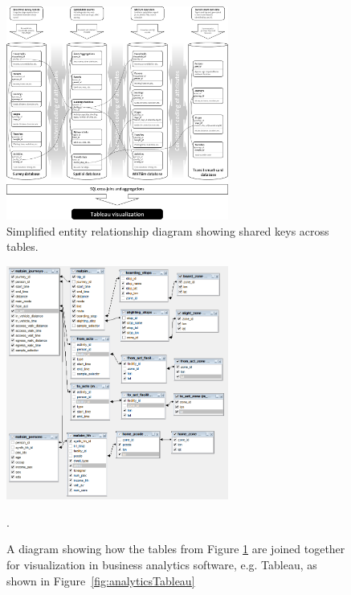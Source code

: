 \begin{figure}
\label{fig:analyticsERD}
\begin{center} \includegraphics[width=0.65\textwidth, angle=0]{extending/figures/businessanalytics/schema} \end{center}
\caption{Simplified entity relationship diagram showing shared keys across tables.}
\end{figure}

\begin{figure}
\label{fig:analyticsFramework}
\begin{center} \includegraphics[width=0.65\textwidth, angle=0]{extending/figures/businessanalytics/join} \end{center}
\caption{A diagram showing how the tables from Figure \ref{fig:analyticsERD} are joined together for visualization in business analytics software, e.g. Tableau, as shown in Figure~\ref{fig:analyticsTableau}}.
\end{figure}


